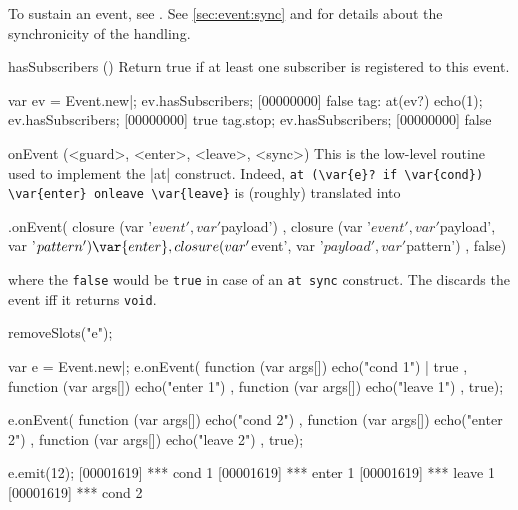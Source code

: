 \begin{urbiscriptapi}
To sustain an event, see .  See \autoref{sec:event:sync}
and  for details about the synchronicity of the handling.



\item[hasSubscribers]()%
  Return true if at least one subscriber is registered to this event.

\begin{urbiscript}
var ev = Event.new|;
ev.hasSubscribers;
[00000000] false
tag: at(ev?) echo(1);
ev.hasSubscribers;
[00000000] true
tag.stop;
ev.hasSubscribers;
[00000000] false
\end{urbiscript}


\item[onEvent](<guard>, <enter>, <leave>, <sync>)%
  This is the low-level routine used to implement the \lstindex|at|
  construct.  Indeed,
  \lstinline|at (\var{e}? if \var{cond}) \var{enter} onleave \var{leave}|
  is (roughly) translated into
\begin{urbiunchecked}
  .onEvent(
    closure (var '$event', var '$payload')                 {   },
    closure (var '$event', var '$payload', var '$pattern') { \var{enter} },
    closure (var '$event', var '$payload', var '$pattern') {  },
    false)
\end{urbiunchecked}

\noindent
where the \lstinline|false| would be \lstinline|true| in case of an
\lstinline|at sync| construct.  The  discards the event iff it
returns \lstinline{void}.

\begin{urbicomment}
removeSlots("e");
\end{urbicomment}
\begin{urbiscript}
var e = Event.new|;
e.onEvent(
  function (var args[]) { echo("cond 1") | true },
  function (var args[]) { echo("enter 1") },
  function (var args[]) { echo("leave 1") },
  true);

e.onEvent(
  function (var args[]) { echo("cond 2") },
  function (var args[]) { echo("enter 2") },
  function (var args[]) { echo("leave 2") },
  true);

e.emit(12);
[00001619] *** cond 1
[00001619] *** enter 1
[00001619] *** leave 1
[00001619] *** cond 2


\end{urbiscript}
\end{urbiscriptapi}
